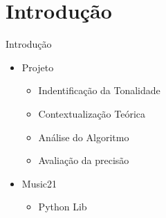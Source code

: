 \section{Introdução}
\begin{frame}{Introdução}{}
\begin{itemize}
   \item Projeto
   \begin{itemize}
      \item Indentificação da Tonalidade
      \item Contextualização Teórica
      \item Análise do Algoritmo
      \item Avaliação da precisão
   \end{itemize}
   \item Music21
   \begin{itemize}
      \item Python Lib
   \end{itemize}
\end{itemize}
\end{frame}
